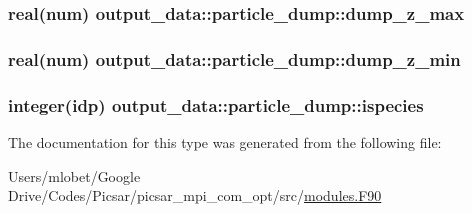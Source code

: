 \subsubsection[{\texorpdfstring{dump\+\_\+z\+\_\+max}{dump_z_max}}]{\setlength{\rightskip}{0pt plus 5cm}real(num) output\+\_\+data\+::particle\+\_\+dump\+::dump\+\_\+z\+\_\+max}\hypertarget{structoutput__data_1_1particle__dump_ab0f909037c7d69a16e199cace191cde3}{}\label{structoutput__data_1_1particle__dump_ab0f909037c7d69a16e199cace191cde3}
\subsubsection[{\texorpdfstring{dump\+\_\+z\+\_\+min}{dump_z_min}}]{\setlength{\rightskip}{0pt plus 5cm}real(num) output\+\_\+data\+::particle\+\_\+dump\+::dump\+\_\+z\+\_\+min}\hypertarget{structoutput__data_1_1particle__dump_a645012e22acb2681967acead28536d90}{}\label{structoutput__data_1_1particle__dump_a645012e22acb2681967acead28536d90}
\subsubsection[{\texorpdfstring{ispecies}{ispecies}}]{\setlength{\rightskip}{0pt plus 5cm}integer(idp) output\+\_\+data\+::particle\+\_\+dump\+::ispecies}\hypertarget{structoutput__data_1_1particle__dump_add7490b6251f083595a221bead55a798}{}\label{structoutput__data_1_1particle__dump_add7490b6251f083595a221bead55a798}


The documentation for this type was generated from the following file\+:\begin{DoxyCompactItemize}
\item 
Users/mlobet/\+Google Drive/\+Codes/\+Picsar/picsar\+\_\+mpi\+\_\+com\+\_\+opt/src/\hyperlink{modules_8_f90}{modules.\+F90}\end{DoxyCompactItemize}
